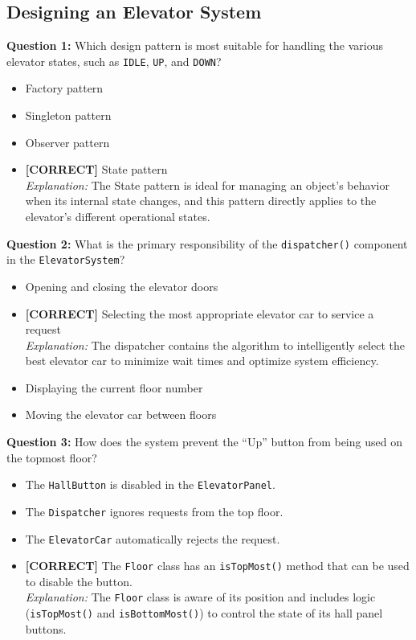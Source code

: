 \subsection*{Designing an Elevator System}
\vspace{0.3cm}
\noindent
\textbf{Question 1:} Which design pattern is most suitable for handling the various elevator states, such as \texttt{IDLE}, \texttt{UP}, and \texttt{DOWN}?
\\[0.2cm]
\begin{itemize}
 \item Factory pattern
 \item Singleton pattern
 \item Observer pattern
 \item \textbf{[CORRECT]} State pattern
\\[0.1cm]
\textit{Explanation:} 
The State pattern is ideal for managing an object's behavior when its internal state changes, and this pattern directly applies to the elevator's different operational states.
\end{itemize}
\vspace{0.3cm}
\noindent
\textbf{Question 2:} What is the primary responsibility of the \texttt{dispatcher()} component in the \texttt{ElevatorSystem}?
\\[0.2cm]
\begin{itemize}
 \item Opening and closing the elevator doors
 \item \textbf{[CORRECT]} Selecting the most appropriate elevator car to service a request
\\[0.1cm]
\textit{Explanation:} 
The dispatcher contains the algorithm to intelligently select the best elevator car to minimize wait times and optimize system efficiency.
 \item Displaying the current floor number
 \item Moving the elevator car between floors
\end{itemize}
\vspace{0.3cm}
\noindent
\textbf{Question 3:} How does the system prevent the ``Up'' button from being used on the topmost floor?
\\[0.2cm]
\begin{itemize}
 \item The \texttt{HallButton} is disabled in the \texttt{ElevatorPanel}.
 \item The \texttt{Dispatcher} ignores requests from the top floor.
 \item The \texttt{ElevatorCar} automatically rejects the request.
 \item \textbf{[CORRECT]} The \texttt{Floor} class has an \texttt{isTopMost()} method that can be used to disable the button.
\\[0.1cm]
\textit{Explanation:} 
The \texttt{Floor} class is aware of its position and includes logic (\texttt{isTopMost()} and \texttt{isBottomMost()}) to control the state of its hall panel buttons.
\end{itemize}
